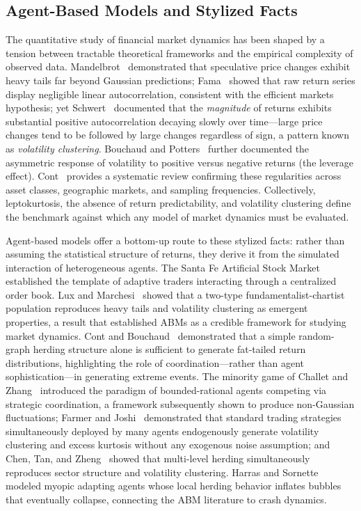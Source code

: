 \documentclass{article}
\theoremstyle{definition}
\theoremstyle{remark}
\begin{document}
\subsection{Agent-Based Models and Stylized Facts}
The quantitative study of financial market dynamics has been shaped by a tension between
tractable theoretical frameworks and the empirical complexity of observed data.
Mandelbrot~\cite{mandelbrot1963variation} demonstrated that speculative price changes
exhibit heavy tails far beyond Gaussian predictions; Fama~\cite{fama1970efficient}
showed that raw return series display negligible linear autocorrelation, consistent with
the efficient markets hypothesis; yet Schwert~\cite{schwert1989volatility} documented
that the \emph{magnitude} of returns exhibits substantial positive autocorrelation
decaying slowly over time---large price changes tend to be followed by large changes
regardless of sign, a pattern known as \emph{volatility clustering}. Bouchaud and
Potters~\cite{bouchaud2002apparent} further documented the asymmetric response of
volatility to positive versus negative returns (the leverage effect). Cont~\cite{cont2001empirical}
provides a systematic review confirming these regularities across asset classes, geographic
markets, and sampling frequencies. Collectively, leptokurtosis, the absence of return
predictability, and volatility clustering define the benchmark against which any model of
market dynamics must be evaluated.

Agent-based models offer a bottom-up route to these stylized facts: rather than assuming
the statistical structure of returns, they derive it from the simulated interaction of
heterogeneous agents. The Santa Fe Artificial Stock Market~\cite{lebaron2000agent} established
the template of adaptive traders interacting through a centralized order book. Lux and
Marchesi~\cite{lux1999scaling} showed that a two-type fundamentalist-chartist population
reproduces heavy tails and volatility clustering as emergent properties, a result that
established ABMs as a credible framework for studying market dynamics. Cont and
Bouchaud~\cite{cont2000herd} demonstrated that a simple random-graph herding structure
alone is sufficient to generate fat-tailed return distributions, highlighting the role of
coordination---rather than agent sophistication---in generating extreme events. The minority
game of Challet and Zhang~\cite{challet1997minority} introduced the paradigm of
bounded-rational agents competing via strategic coordination, a framework subsequently shown
to produce non-Gaussian fluctuations; Farmer and Joshi~\cite{farmer2002price} demonstrated
that standard trading strategies simultaneously deployed by many agents endogenously generate
volatility clustering and excess kurtosis without any exogenous noise assumption; and Chen,
Tan, and Zheng~\cite{chen2015herding} showed that multi-level herding simultaneously
reproduces sector structure and volatility clustering. Harras and
Sornette~\cite{harras2012noise} modeled myopic adapting agents whose local herding behavior
inflates bubbles that eventually collapse, connecting the ABM literature to crash dynamics.
\end{document}
